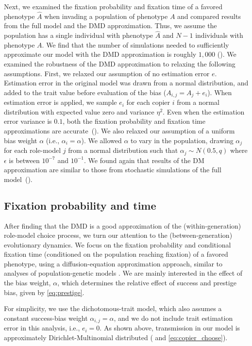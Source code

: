 \documentclass[12pt]{extarticle}
\begin{document}
Next, we examined the fixation probability and fixation time of a favored phenotype $\hat{A}$ when invading a population of phenotype $A$ and compared results from the full model and the DMD approximation.
Thus, we assume the population has a single individual with phenotype $\hat{A}$ and $N-1$ individuals with phenotype $A$. 
We find that the number of simulations needed to sufficiently approximate our model with the DMD approximation is roughly $1,000$ ().
We examined the robustness of the DMD approximation to relaxing the following assumptions.
First, we relaxed our assumption of no estimation error $e$.
Estimation error in the original model was drawn from a normal distribution, and added to the trait value before evaluation of the bias ($A_{i,j} = A_j + e_i$).
When estimation error is applied, we sample $e_i$ for each copier $i$ from a normal distribution with expected value zero and variance $\eta^2$.
Even when the estimation error variance is $0.1$, both the fixation probability and fixation time approximations are accurate~(). 
We also relaxed our assumption of a uniform bias weight $\alpha$ (i.e., $\alpha_i=\alpha$). We allowed $\alpha$ to vary in the population, drawing $\alpha_j$ for each role-model $j$ from a normal distribution such that $\alpha_j \sim N(0.5,q)$ where $\epsilon$ is between $10^{-7}$ and $10^{-1}$. 
We found again that results of the DM approximation are similar to those from stochastic simulations of the full model~().


\subsection*{Fixation probability and time}
After finding that the DMD is a good approximation of the (within-generation) role-model choice process, we turn our attention to the (between-generation) evolutionary dynamics.
We focus on the fixation probability and conditional fixation time (conditioned on the population reaching fixation) of a favored phenotype, using a diffusion-equation approximation approach, similar to analyses of population-genetic models \citep{kimura,kimura_average,otto_fixation}.
We are mainly interested in the effect of the bias weight, $\alpha$, which determines the relative effect of success and prestige bias, given by \cref{eq:prestige}.

For simplicity, we use the dichotomous-trait model, which also assumes a constant success-bias weight $\alpha_{i,j}=\alpha$, and we do not include trait estimation error in this analysis, i.e., $e_i=0$.
As shown above, transmission in our model is approximately Dirichlet-Multinomial distributed ( and \cref{eq:copier_choose}).
\end{document}
